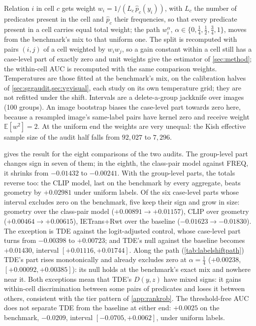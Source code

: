 Relation $i$ in cell $c$ gets weight $w_i=1/(L_c\,\hat p_c(y_i))$, with $L_c$ the number of
predicates present in the cell and $\hat p_c$ their frequencies, so that every predicate present
in a cell carries equal total weight; the path $w_i^\alpha$, $\alpha\in\{0,\tfrac14,\tfrac12,
\tfrac34,1\}$, moves from the benchmark's mix to that uniform one. The split is recomputed
with pairs $(i,j)$ of a cell weighted by $w_iw_j$, so a gain constant within a cell still has a
case-level part of exactly zero and unit weights give the estimator of \cref{sec:method}; the
within-cell AUC is recomputed with the same comparison weights. Temperatures are those fitted
at the benchmark's mix, on the calibration halves of \cref{sec:sggaudit,sec:vgvisual}, each
study on its own temperature grid; they are not refitted under the shift. Intervals are a
delete-a-group jackknife over images (100 groups). An image bootstrap biases the case-level
part towards zero here, because a resampled image's same-label pairs have kernel zero and
receive weight $\mathbb E[w^2]=2$. At the uniform end the weights are very unequal: the
Kish effective sample size of the audit half falls from $92{,}027$ to $7{,}296$.

 gives the result for the eight comparisons of the two audits. The
group-level part changes sign in seven of them; in the eighth, the class-pair model against
FREQ, it shrinks from $-0.01432$ to $-0.00241$. With the group-level parts, the totals reverse
too: the CLIP model, last on the benchmark by every aggregate, beats geometry by $+0.02981$
under uniform labels. Of the six case-level parts whose interval excludes zero on the
benchmark, five keep their sign and grow in size: geometry over the class-pair model
($+0.00891\to+0.01157$), CLIP over geometry ($+0.00464\to+0.00615$), IETrans+Rwt over the
baseline ($-0.01623\to-0.01830$). The exception is TDE against the logit-adjusted control,
whose case-level part turns from $-0.00398$ to $+0.00723$; and TDE's null against the
baseline becomes $+0.01430$, interval $[+0.01116,+0.01744]$. Along the path
(\cref{tab:labelshiftpath}) TDE's part rises monotonically and already excludes zero at
$\alpha=\tfrac14$ ($+0.00238$, $[+0.00092,+0.00385]$): its null holds at the benchmark's exact
mix and nowhere near it. Both exceptions mean that TDE's $D(y,z)$ have mixed signs: it gains
within-cell discrimination between some pairs of predicates and loses it between others,
consistent with the tier pattern of \cref{app:rankrob}. The threshold-free AUC does not
separate TDE from the baseline at either end: $+0.0025$ on the benchmark, $-0.0209$, interval
$[-0.0705,+0.0062]$, under uniform labels.

